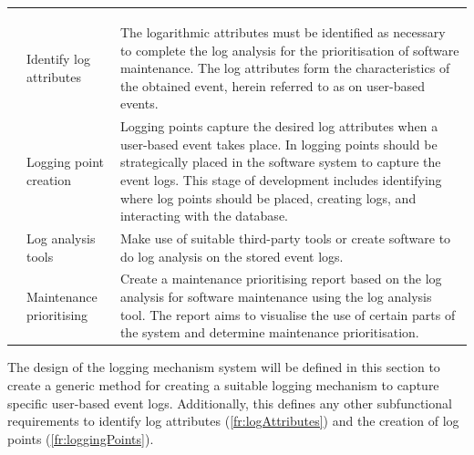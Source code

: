 \setcounter{phase}{0}
\begin{xltabular}{\textwidth}{llX}
	\caption[Functional requirements of the solution]{\textit{Functional requirements of the solution}}\label{tbl:ch2_developmenetRequirements} \\ 
	\toprule
	 &  &  \\
	\midrule
	\endfirsthead

	\caption[]{\continueCaption} \\
	\toprule
	 &  &  \\
	\midrule
	\endhead

	\midrule
	 \\ 
	\endfoot
	\endlastfoot

	 & Identify log attributes & \RaggedRight The logarithmic attributes must be identified as necessary to complete the log analysis for the prioritisation of software maintenance. The log attributes form the characteristics of the obtained event, herein referred to as on user-based events. \\

	 & Logging point creation & \RaggedRight Logging points capture the desired log attributes when a user-based event takes place. In  logging points should be strategically placed in the software system to capture the event logs. This stage of development includes identifying where log points should be placed, creating logs, and interacting with the database. \\

	 & \RaggedRight Log analysis tools & Make use of suitable third-party tools or create software to do log analysis on the stored event logs. \\

	 & \RaggedRight Maintenance prioritising & Create a maintenance prioritising report based on the log analysis for software maintenance using the log analysis tool. The report aims to visualise the use of certain parts of the system and determine maintenance prioritisation. \\
	\bottomrule
\end{xltabular}

The design of the logging mechanism system will be defined in this section to create a generic method for creating a suitable logging mechanism to capture specific user-based event logs. Additionally, this defines any other subfunctional requirements to identify log attributes (\ref{fr:logAttributes}) and the creation of log points (\ref{fr:loggingPoints}).

